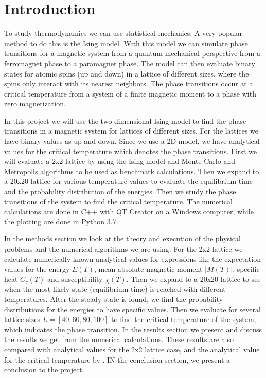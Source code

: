 \documentclass[12pt,a4paper,english]{article}
\begin{document}
\section{Introduction}
\label{sect:Introduction}
To study thermodynamics we can use statistical mechanics. A very popular method to do this is the Ising model. With this model we can simulate phase transitions for a magnetic system from a quantum mechanical perspective from a ferromagnet phase to a paramagnet phase. The model can then evaluate binary states for atomic spins (up and down) in a lattice of different sizes, where the spins only interact with its nearest neighbors. The phase transitions occur at a critical temperature from a system of a finite magnetic moment to a phase with zero magnetization.

In this project we will use the two-dimensional Ising model to find the phase transitions in a magnetic system for lattices of different sizes. For the lattices we have binary values as up and down. Since we use a 2D model, we have analytical values for the critical temperature which denotes the phase transitions. First we will evaluate a 2x2 lattice by using the Ising model and Monte Carlo and Metropolis algorithms to be used as benchmark calculations. Then we expand to a 20x20 lattice for various temperature values to evaluate the equilibrium time and the probability distribution of the energies. Then we study the phase transitions of the system to find the critical temperature. The numerical calculations are done in C++ with QT Creator on a Windows computer, while the plotting are done in Python 3.7.

In the methods section we look at the theory and execution of the physical problems and the numerical algorithms we are using. For the 2x2 lattice we calculate numerically known analytical values for expressions like the expectation values for the energy $E(T)$, mean absolute magnetic moment $|M(T)|$, specific heat $C_v(T)$ and susceptibility $\chi(T)$. Then we expand to a 20x20 lattice to see when the most likely state (equilibrium time) is reached with different temperatures. After the steady state is found, we find the probability distributions for the energies to have specific values. Then we evaluate for several lattice sizes $L=[40,60,80,100]$ to find the critical temperature of the system, which indicates the phase transition. In the results section we present and discuss the results we get from the numerical calculations. These results are also compared with analytical values for the 2x2 lattice case, and the analytical value for the critical temperature by \citet{PhysRev.65.117}. IN the conclusion section, we present a conclusion to the project.
\end{document}
